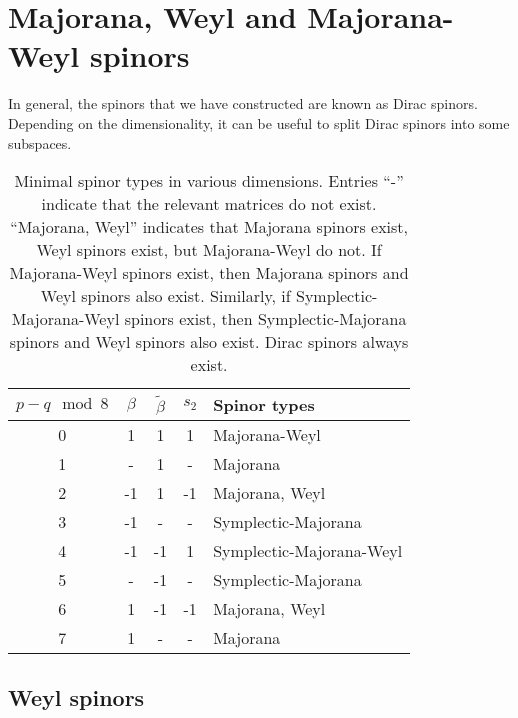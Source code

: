 \documentclass[11pt]{article}
\newcommand{\betat}{\tilde{\beta}}
\begin{document}

\section{Majorana, Weyl and Majorana-Weyl spinors}\label{sec:subtypes}

In general, the spinors that we have constructed are known as Dirac spinors.
Depending on the dimensionality, it can be useful to split Dirac spinors into some subspaces.


\begin{table}
  \centering
  \begin{tabular}{ccccl}
  \toprule
    $p-q \mod 8$ & $\beta$ & $\betat$ & $s_2$ & Spinor types  \\
  \midrule
    0 & 1  & 1  & 1  & Majorana-Weyl            \\
    1 & -  & 1  & -  & Majorana                 \\
    2 & -1 & 1  & -1 & Majorana, Weyl           \\
    3 & -1 & -  & -  & Symplectic-Majorana      \\
    4 & -1 & -1 & 1  & Symplectic-Majorana-Weyl \\
    5 & -  & -1 & -  & Symplectic-Majorana      \\
    6 & 1  & -1 & -1 & Majorana, Weyl           \\
    7 & 1  & -  & -  & Majorana                 \\
  \bottomrule
  \end{tabular}
  \caption{Minimal spinor types in various dimensions.
  Entries ``-'' indicate that the relevant matrices do not exist.
  ``Majorana, Weyl'' indicates that Majorana spinors exist, Weyl spinors exist, but Majorana-Weyl do not.
  If Majorana-Weyl spinors exist, then Majorana spinors and Weyl spinors also exist.
  Similarly, if Symplectic-Majorana-Weyl spinors exist, then Symplectic-Majorana spinors and Weyl spinors also exist.
  Dirac spinors always exist.
  }\label{tab:types}
\end{table}



\subsection{Weyl spinors}\label{sec:weyl}
\end{document}
